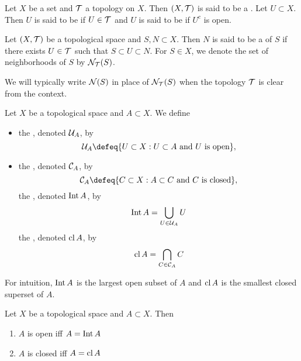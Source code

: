 \documentclass{book}
\begin{document}
	\begin{defn} 
	Let $X$ be a set and $\mathcal{T}$ a topology on $X$. Then $(X, \mathcal{T})$ is said to be a . Let $U \subset X$. Then $U$ is said to be  if $U \in \mathcal{T}$ and $U$ is said to be  if $U^c$ is open.
	\end{defn}
	
	\begin{defn} 
	Let $(X, \mathcal{T})$ be a topological space and $S,N \subset X$. Then $N$ is said to be a  of $S$ if there exists $U \in \mathcal{T}$ such that $S \subset U \subset N$. For $S \in X$, we denote the set of neighborhoods of $S$ by $\mathcal{N}_{\mathcal{T}}(S)$.
	\end{defn}

	\begin{note}
		We will typically write $\mathcal{N}(S)$ in place of $\mathcal{N}_{\mathcal{T}}(S)$ when the topology $\mathcal{T}$ is clear from the context.
	\end{note}
	
	\begin{defn} 
	Let $X$ be a topological space and $A \subset X$. We define
	\begin{itemize}
		\item the , denoted $\mathcal{U}_A$, by 
		$$\MU_{A} \defeq \{U \subset X:U \subset A \text{ and $U$ is open}\},$$ 
		\item the , denoted $\mathcal{C}_A$, by 
		$$\MC_{A} \defeq \{C \subset X: A \subset C \text{ and $C$ is closed}\},$$ 
		the , denoted $\operatorname{Int} A$, by 
		$$\operatorname{Int} A = \bigcup_{U \in \mathcal{U}_{A}} U$$ 
		the , denoted $\operatorname{cl} A$, by 
		$$\operatorname{cl} A = \bigcap_{C \in \mathcal{C}_{A}} C$$ 
	\end{itemize}
	\end{defn}

	\begin{note}
		For intuition, $\operatorname{Int} A$ is the largest open subset of $A$ and $\operatorname{cl} A$ is the smallest closed superset of $A$. 
	\end{note}
	
	\begin{defn} 
	Let $X$ be a topological space and $A \subset X$. Then 
	\begin{enumerate}
	\item $A$ is open iff $A = \operatorname{Int} A$ 
	\item $A$ is closed iff $A = \operatorname{cl} A$
	\end{enumerate}
	\end{defn}
	
\end{document}
